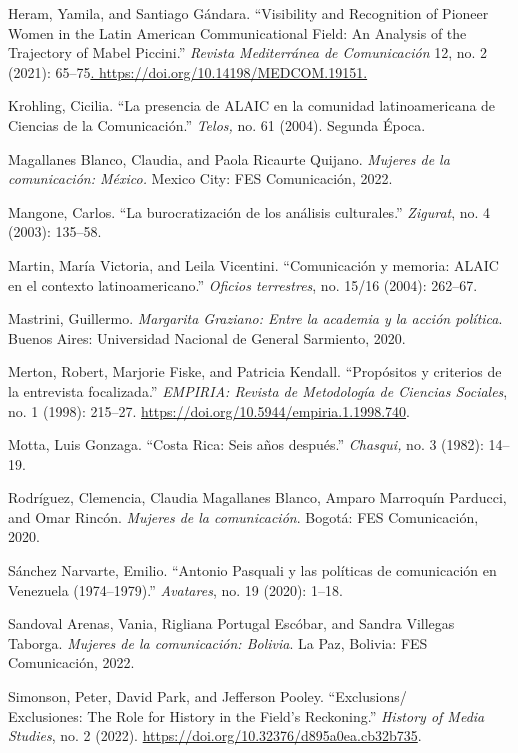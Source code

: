 \documentclass{tufte-handout}
\begin{document}
\begin{hangparas}{.25in}{1}
Heram, Yamila, and Santiago Gándara. ``Visibility and Recognition of
Pioneer Women in the Latin American Communicational Field: An Analysis
of the Trajectory of Mabel Piccini.'' \emph{Revista Mediterránea de
Comunicación} 12, no. 2 (2021):
65--75\href{file:///Users/Emily/Desktop/.\%20https:/doi.org/10.14198/MEDCOM.19151.}{.
https://doi.org/10.14198/MEDCOM.19151.}

Krohling, Cicilia. ``La presencia de ALAIC en la comunidad
latinoamericana de Ciencias de la Comunicación.'' \emph{Telos,} no. 61
(2004). Segunda Época.

Magallanes Blanco, Claudia, and Paola Ricaurte Quijano. \emph{Mujeres de
la comunicación: México.} Mexico City: FES Comunicación, 2022.

Mangone, Carlos. ``La burocratización de los análisis culturales.''
\emph{Zigurat}, no. 4 (2003): 135--58.

Martin, María Victoria, and Leila Vicentini. ``Comunicación y memoria:
ALAIC en el contexto latinoamericano.'' \emph{Oficios terrestres}, no.
15/16 (2004): 262--67.

Mastrini, Guillermo. \emph{Margarita Graziano: Entre la academia y la
acción política}. Buenos Aires: Universidad Nacional de General
Sarmiento, 2020.

Merton, Robert, Marjorie Fiske, and Patricia Kendall. ``Propósitos y
criterios de la entrevista focalizada.'' \emph{EMPIRIA: Revista de
Metodología de Ciencias Sociales}, no. 1 (1998):
215--27. \url{https://doi.org/10.5944/empiria.1.1998.740}.

Motta, Luis Gonzaga. ``Costa Rica: Seis años después.'' \emph{Chasqui,}
no. 3 (1982): 14--19.

Rodríguez, Clemencia, Claudia Magallanes Blanco, Amparo Marroquín
Parducci, and Omar Rincón. \emph{Mujeres de la comunicación}. Bogotá:
FES Comunicación, 2020.

Sánchez Narvarte, Emilio. ``Antonio Pasquali y las políticas de
comunicación en Venezuela (1974--1979).'' \emph{Avatares}, no. 19
(2020): 1--18.

Sandoval Arenas, Vania, Rigliana Portugal Escóbar, and Sandra Villegas
Taborga. \emph{Mujeres de la comunicación: Bolivia}. La Paz, Bolivia:
FES Comunicación, 2022.

Simonson, Peter, David Park, and Jefferson Pooley.
``Exclusions/\\\hspace{.25in}Exclusiones: The Role for History in the Field's
Reckoning.'' \emph{History of Media Studies}, no. 2 (2022).
\url{https://doi.org/10.32376/d895a0ea.cb32b735}.


\end{hangparas}
\end{document}
